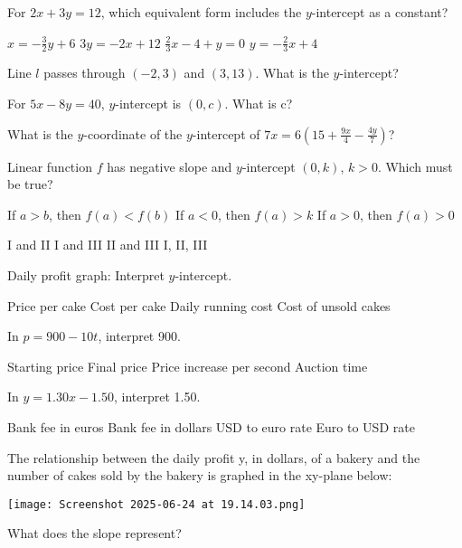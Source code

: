 \documentclass[12pt]{exam}
\begin{document}
\begin{questions}
\question For $2x + 3y = 12$, which equivalent form includes the $y$-intercept as a constant?
\begin{choices}
\choice $x = -\frac{3}{2}y + 6$
\choice $3y = -2x + 12$
\choice $\frac{2}{3}x - 4 + y = 0$
\choice $y = -\frac{2}{3}x + 4$
\end{choices}

\question Line $l$ passes through $(-2,3)$ and $(3,13)$. What is the $y$-intercept?

\question For $5x - 8y = 40$, $y$-intercept is $(0,c)$. What is c?

\question What is the $y$-coordinate of the $y$-intercept of $7x = 6 \left( 15 + \frac{9x}{4} - \frac{4y}{7} \right)$?

\question Linear function $f$ has negative slope and $y$-intercept $(0,k)$, $k > 0$. Which must be true?
\begin{choices}
\choice If $a > b$, then $f(a) < f(b)$
\choice If $a < 0$, then $f(a) > k$
\choice If $a > 0$, then $f(a) > 0$
\end{choices}
\begin{choices}
\choice I and II
\choice I and III
\choice II and III
\choice I, II, III
\end{choices}

\question Daily profit graph: Interpret $y$-intercept.
\begin{choices}
\choice Price per cake
\choice Cost per cake
\choice Daily running cost
\choice Cost of unsold cakes
\end{choices}

\question In $p = 900 - 10t$, interpret 900.
\begin{choices}
\choice Starting price
\choice Final price
\choice Price increase per second
\choice Auction time
\end{choices}

\question In $y = 1.30x - 1.50$, interpret 1.50.
\begin{choices}
\choice Bank fee in euros
\choice Bank fee in dollars
\choice USD to euro rate
\choice Euro to USD rate
\end{choices}

\question The relationship between the daily profit y, in dollars, of a bakery and the number of cakes sold by the bakery is graphed in the xy-plane below:
\begin{center}
\texttt{[image: Screenshot 2025-06-24 at 19.14.03.png]}
\end{center}

\question What does the slope represent?


\end{questions}
\end{document}
